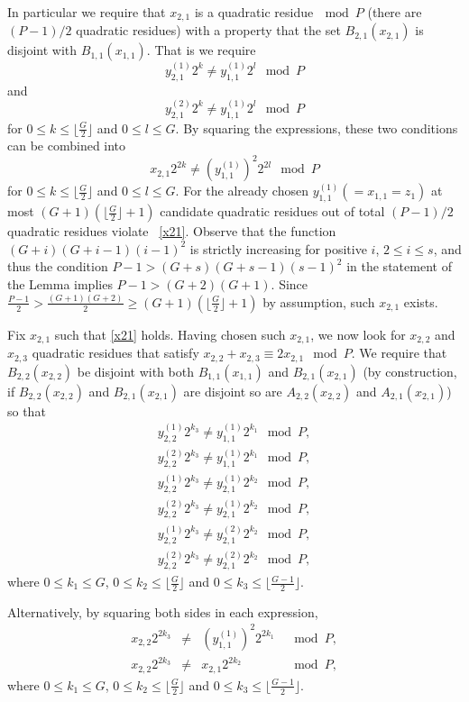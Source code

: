In particular we require that $x_{2,1}$ is a quadratic
residue$~\mod P$ (there are $(P-1)/2$ quadratic residues) with a
property that the set $B_{2,1}(x_{2,1})$ is disjoint with
$B_{1,1}(x_{1,1})$. That is we require \[y_{2,1}^{(1)}2^k \neq
y_{1,1}^{(1)} 2^l \mod P \] and
\[y_{2,1}^{(2)}2^k \neq y_{1,1}^{(1)} 2^l \mod P \] for $0 \leq k \leq \lfloor
\frac{G}{2} \rfloor$ and $0 \leq l \leq G$. By squaring the
expressions, these two conditions can be combined into
\begin{equation}\label{x21}x_{2,1}2^{2k} \neq (y_{1,1}^{(1)})^2 2^{2l} \mod P \end{equation}for $0
\leq k \leq \lfloor \frac{G}{2} \rfloor$ and $0 \leq l \leq G$.
For the already chosen $y_{1,1}^{(1)}(=x_{1,1}=z_1)$ at most
$(G+1)(\lfloor \frac{G}{2} \rfloor+1)$ candidate quadratic
residues out of total $(P-1)/2$ quadratic residues violate
~\eqref{x21}. Observe that the function $(G+i)(G+i-1)(i-1)^2$ is
strictly increasing for positive $i$, $2 \leq i \leq s$, and thus
the condition $P-1> (G+s)(G+s-1)(s-1)^2$ in the statement of the
Lemma implies $P-1>(G+2)(G+1)$. Since $\frac{P-1}{2} >
\frac{(G+1)(G+2)}{2} \geq (G+1)(\lfloor \frac{G}{2} \rfloor+1)$ by
assumption, such $x_{2,1}$ exists.

Fix $x_{2,1}$ such that \eqref{x21} holds. Having chosen such
$x_{2,1}$, we now look for $x_{2,2}$ and $x_{2,3}$ quadratic
residues that satisfy $x_{2,2}+x_{2,3} \equiv 2x_{2,1} \mod P$. We
require that $B_{2,2}(x_{2,2})$ be disjoint with both
$B_{1,1}(x_{1,1})$ and $B_{2,1}(x_{2,1})$ (by construction, if
$B_{2,2}(x_{2,2})$ and $B_{2,1}(x_{2,1})$ are disjoint so are
$A_{2,2}(x_{2,2})$ and $A_{2,1}(x_{2,1})$) so that
\begin{eqnarray*}
y_{2,2}^{(1)}2^{k_3} \neq y_{1,1}^{(1)} 2^{k_1} \mod P, \\
y_{2,2}^{(2)}2^{k_3} \neq y_{1,1}^{(1)} 2^{k_1} \mod P,  \\
y_{2,2}^{(1)}2^{k_3} \neq y_{2,1}^{(1)} 2^{k_2} \mod P, \\
y_{2,2}^{(2)}2^{k_3} \neq y_{2,1}^{(1)} 2^{k_2} \mod P,  \\
y_{2,2}^{(1)}2^{k_3} \neq y_{2,1}^{(2)} 2^{k_2} \mod P, \\
y_{2,2}^{(2)}2^{k_3} \neq y_{2,1}^{(2)} 2^{k_2} \mod P,
\end{eqnarray*}
where $0 \leq k_1 \leq G$, $0 \leq k_2 \leq \lfloor \frac{G}{2}
\rfloor$ and $0 \leq k_3 \leq \lfloor\frac{G-1}{2} \rfloor$.

Alternatively, by squaring both sides in each expression,
\begin{equation}\label{eqx22}\begin{array}{cccc}
x_{2,2}2^{2k_3} &\neq& (y_{1,1}^{(1)})^2 2^{2k_1} &\mod P, \\
x_{2,2}2^{2k_3} &\neq& x_{2,1} 2^{2k_2} &\mod P,
\end{array}\end{equation}
where $0 \leq k_1 \leq G$, $0 \leq k_2 \leq \lfloor \frac{G}{2}
\rfloor$ and $0 \leq k_3 \leq \lfloor\frac{G-1}{2} \rfloor$.

